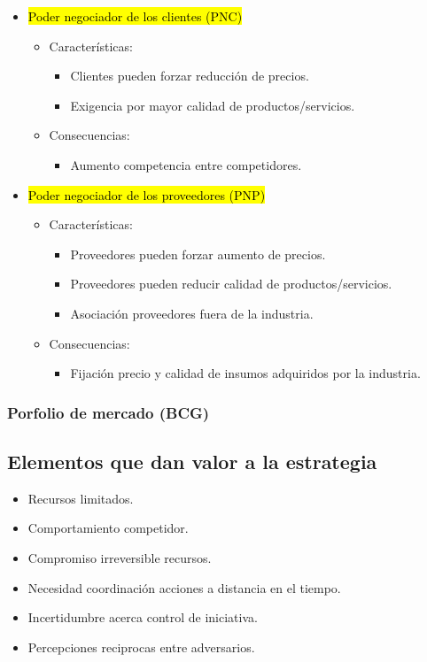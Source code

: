 \documentclass{templateNote}
\begin{document}
\begin{itemize}
    \item \hypertarget{clientes}{\hl{Poder negociador de los clientes (PNC)}}
    \begin{itemize}
        \item Características:
        \begin{itemize}
            \item Clientes pueden forzar reducción de precios.
            \item Exigencia por mayor calidad de productos/servicios.
        \end{itemize}
        \item Consecuencias:
        \begin{itemize}
            \item Aumento competencia entre competidores.
        \end{itemize}
    \end{itemize}
    \item \hypertarget{proveedores}{\hl{Poder negociador de los proveedores (PNP)}}
    \begin{itemize}
        \item Características:
        \begin{itemize}
            \item Proveedores pueden forzar aumento de precios.
            \item Proveedores pueden reducir calidad de productos/servicios.
            \item Asociación proveedores fuera de la industria.
        \end{itemize}
        \item Consecuencias:
        \begin{itemize}
            \item Fijación precio y calidad de insumos adquiridos por la industria.
        \end{itemize}
    \end{itemize}
\end{itemize}

\newpage
\subsubsection{Porfolio de mercado (BCG)}
\subsection{Elementos que dan valor a la estrategia}
\begin{itemize}
    \item Recursos limitados.
    \item Comportamiento competidor.
    \item Compromiso irreversible recursos.
    \item Necesidad coordinación acciones a distancia en el tiempo.
    \item Incertidumbre acerca control de iniciativa.
    \item Percepciones reciprocas entre adversarios.
\end{itemize}
\end{document}
